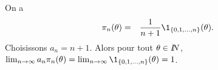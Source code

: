 \begin{rep} %
On a 
\begin{eqnarray*}
\pi_n(\theta) & = & \frac{1}{n+1}\1_{\{0,1,\ldots,n\}}(\theta).
\end{eqnarray*}
Choisissons $a_n=n+1$. Alors pour tout $\theta\in I\!\!N$, $\lim_{n\to\infty} a_n \pi_n(\theta) = \lim_{n\to\infty} \1_{\{0,1,\ldots,n\}}(\theta) = 1$. 
\end{rep}